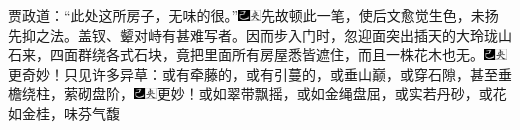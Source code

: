 贾政道：“此处这所房子，无味的很。”{\includegraphics[width=3mm]{../Images/00003}\includegraphics[width=3mm]{../Images/00012}\footnotesize \kaishu 先故顿此一笔，使后文愈觉生色，未扬先抑之法。盖钗、颦对峙有甚难写者。}因而步入门时，忽迎面突出插天的大玲珑山石来，四面群绕各式石块，竟把里面所有房屋悉皆遮住，而且一株花木也无。{\includegraphics[width=3mm]{../Images/00003}\includegraphics[width=3mm]{../Images/00012}\footnotesize \kaishu 更奇妙！}只见许多异草：或有牵藤的，或有引蔓的，或垂山巅，或穿石隙，甚至垂檐绕柱，萦砌盘阶，{\includegraphics[width=3mm]{../Images/00003}\includegraphics[width=3mm]{../Images/00012}\footnotesize \kaishu 更妙！}或如翠带飘摇，或如金绳盘屈，或实若丹砂，或花如金桂，味芬气馥